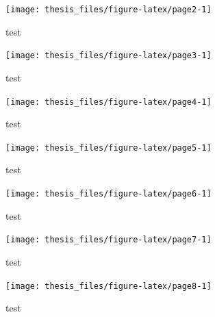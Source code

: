 \documentclass[12pt,oneside]{reedthesis}
\begin{document}
\footnotesize
\begin{figure}

{\centering \texttt{[image: thesis\_files/figure-latex/page2-1]} 

}

\caption{test}\label{fig:page2}
\end{figure}
\normalsize

\footnotesize
\begin{figure}

{\centering \texttt{[image: thesis\_files/figure-latex/page3-1]} 

}

\caption{test}\label{fig:page3}
\end{figure}
\normalsize

\footnotesize
\begin{figure}

{\centering \texttt{[image: thesis\_files/figure-latex/page4-1]} 

}

\caption{test}\label{fig:page4}
\end{figure}
\normalsize

\footnotesize
\begin{figure}

{\centering \texttt{[image: thesis\_files/figure-latex/page5-1]} 

}

\caption{test}\label{fig:page5}
\end{figure}
\normalsize

\footnotesize
\begin{figure}

{\centering \texttt{[image: thesis\_files/figure-latex/page6-1]} 

}

\caption{test}\label{fig:page6}
\end{figure}
\normalsize

\footnotesize
\begin{figure}

{\centering \texttt{[image: thesis\_files/figure-latex/page7-1]} 

}

\caption{test}\label{fig:page7}
\end{figure}
\normalsize

\footnotesize
\begin{figure}

{\centering \texttt{[image: thesis\_files/figure-latex/page8-1]} 

}

\caption{test}\label{fig:page8}
\end{figure}
\normalsize
\end{document}
